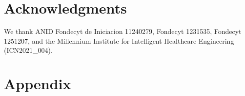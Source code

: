 \documentclass{article}
\begin{document}
\section{Acknowledgments}\label{sec:acknowledgments}
We thank ANID Fondecyt de Iniciacion 11240279, Fondecyt 1231535, Fondecyt 1251207, and the Millennium Institute for Intelligent Healthcare Engineering (ICN2021\_004).
















\newpage
\section{Appendix}
\end{document}
